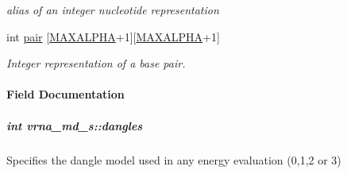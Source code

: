 \begin{DoxyCompactItemize}
\begin{DoxyCompactList}\small\item\em alias of an integer nucleotide representation \end{DoxyCompactList}\item 
\hypertarget{group__model__details_ab4da594c638707e212f64aadb54a7454}{}int \hyperlink{group__model__details_ab4da594c638707e212f64aadb54a7454}{pair} \mbox{[}\hyperlink{group__model__details_ga05a5ffe718aa431d97419a12fb082379}{M\+A\+X\+A\+L\+P\+H\+A}+1\mbox{]}\mbox{[}\hyperlink{group__model__details_ga05a5ffe718aa431d97419a12fb082379}{M\+A\+X\+A\+L\+P\+H\+A}+1\mbox{]}\label{group__model__details_ab4da594c638707e212f64aadb54a7454}

\begin{DoxyCompactList}\small\item\em Integer representation of a base pair. \end{DoxyCompactList}\end{DoxyCompactItemize}


\paragraph{Field Documentation}
\hypertarget{group__model__details_adcda4ff2ea77748ae0e8700288282efc}{}
\subparagraph[{dangles}]{\setlength{\rightskip}{0pt plus 5cm}int vrna\+\_\+md\+\_\+s\+::dangles}\label{group__model__details_adcda4ff2ea77748ae0e8700288282efc}


Specifies the dangle model used in any energy evaluation (0,1,2 or 3) 


